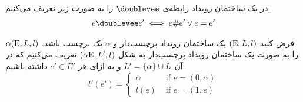 \begin{definition}
    در یک ساختمان رویداد رابطه‌ی
    $\doublevee$
    را به صورت زیر تعریف می‌کنیم:
    \begin{align*}
        e \doublevee e' \iff e \# e' \vee e = e'
    \end{align*}
\end{definition}

\begin{definition}
    فرض کنید
    $(\mathrm{E},L,l)$
    یک ساختمان رویداد برچسب‌دار و
    $\alpha$
    یک برچسب باشد.
    $\alpha(\mathrm{E},L,l)$
    را به صورت یک ساختمان رویداد برچسب‌دار به شکل
    $(\alpha \mathrm{E},L',l)$
    تعریف می‌کنیم که در آن
    $L' = \{\alpha\}\cup L$
    و به ازای هر
    $e' \in E'$
    داشته باشیم:
    $$
        l'(e') = \begin{cases}
            \alpha & \text{ if } e = (0,\alpha) \\
            l(e)   & \text{ if } e = (1,e)
        \end{cases}
    $$
\end{definition}

